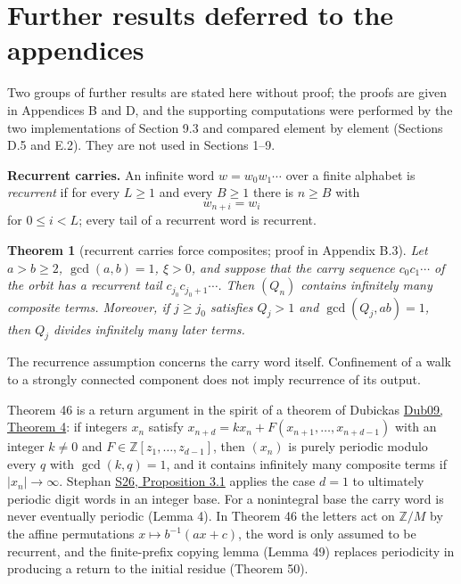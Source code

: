 \documentclass[11pt,reqno]{amsart}
\newtheorem{theorem}{Theorem}
\theoremstyle{definition}
\theoremstyle{remark}
\begin{document}
\section{Further results deferred to the appendices}\label{sec:10}

Two groups of further results are stated here without proof; the proofs
are given in Appendices B and D, and the supporting computations were
performed by the two implementations of Section 9.3 and compared element
by element (Sections D.5 and E.2). They are not used in Sections 1--9.

\textbf{Recurrent carries.} An infinite word \(w=w_0w_1\cdots\) over a finite
alphabet is \emph{recurrent} if for every \(L\ge1\) and every \(B\ge1\) there
is \(n\ge B\) with
\[
w_{n+i}=w_i
\]
for \(0\le i<L\); every tail of a
recurrent word is recurrent.

\begin{samepage}
\begin{theorem}[recurrent carries force composites; proof in Appendix B.3]\leavevmode\label{thm:46}
Let \(a>b\ge2\), \(\gcd(a,b)=1\), \(\xi>0\), and
\emph{suppose that the carry sequence \(c_0c_1\cdots\) of the orbit has a
recurrent tail} \(c_{j_0}c_{j_0+1}\cdots\). Then \((Q_n)\) contains
infinitely many composite terms. Moreover, if \(j\ge j_0\) satisfies
\(Q_j>1\) and \(\gcd(Q_j,ab)=1\), then \(Q_j\) divides infinitely many
later terms.
\label{thm-end:46}
\end{theorem}
\end{samepage}

The recurrence assumption concerns the carry word itself. Confinement
of a walk to a strongly connected component does not imply recurrence
of its output.

Theorem 46 is a return argument in the spirit of a theorem of Dubickas
\hyperref[ref-dub09]{Dub09, Theorem 4}: if integers \(x_n\) satisfy
\(x_{n+d}=kx_n+F(x_{n+1},\ldots,x_{n+d-1})\) with an integer \(k\ne0\)
and \(F\in\mathbb Z[z_1,\ldots,z_{d-1}]\), then \((x_n)\) is purely
periodic modulo every \(q\) with \(\gcd(k,q)=1\), and it contains
infinitely many composite terms if \(|x_n|\to\infty\). Stephan
\hyperref[ref-s26]{S26, Proposition 3.1} applies the case \(d=1\) to
ultimately periodic digit words in an integer base. For a nonintegral
base the carry word is never eventually periodic (Lemma 4). In
Theorem 46 the letters act on \(\mathbb Z/M\) by the affine permutations
\(x\mapsto b^{-1}(ax+c)\), the word is only assumed to be recurrent,
and the finite-prefix copying lemma (Lemma 49) replaces periodicity in
producing a return to the initial residue (Theorem 50).
\end{document}
